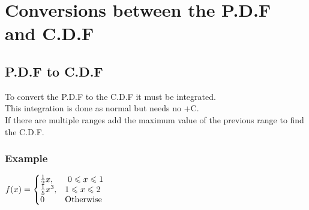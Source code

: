 \documentclass{article}[18pt]
\begin{document}
\section{Conversions between the P.D.F and C.D.F}
\subsection{P.D.F to C.D.F}
To convert the P.D.F to the C.D.F it must be integrated.\\
This integration is done as normal but needs no +C.\\
If there are multiple ranges add the maximum value of the previous range to find the C.D.F.
\subsubsection{Example}
{\renewcommand{\arraystretch}{1.5}
$
  f(x)=\left\{
  \begin{array}{@{}ll@{}}
    \frac{1}{2}x, & \ 0\leqslant x\leqslant1\\
    \frac{1}{5}x^3, &  1\leqslant x \leqslant 2\\
    0 & \textrm{Otherwise}
  \end{array}\right.
$}\\
\end{document}
